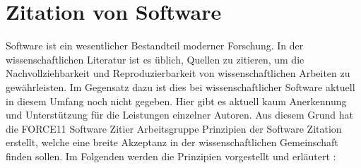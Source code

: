 \section{Zitation von Software}
\label{sec:software-zitation}
Software ist ein wesentlicher Bestandteil moderner Forschung.
In der wissenschaftlichen Literatur ist es üblich, Quellen zu zitieren, um die Nachvollziehbarkeit und Reproduzierbarkeit von wissenschaftlichen Arbeiten zu gewährleisten.
Im Gegensatz dazu ist dies bei wissenschaftlicher Software aktuell in diesem Umfang noch nicht gegeben.
Hier gibt es aktuell kaum Anerkennung und Unterstützung für die Leistungen einzelner Autoren.
Aus diesem Grund hat die \glqq FORCE11 Software Zitier Arbeitsgruppe\grqq{} Prinzipien der Software Zitation erstellt, welche eine breite Akzeptanz in der wissenschaftlichen Gemeinschaft finden sollen.
Im Folgenden werden die Prinzipien vorgestellt und erläutert \cite{smith_software_2016}:

